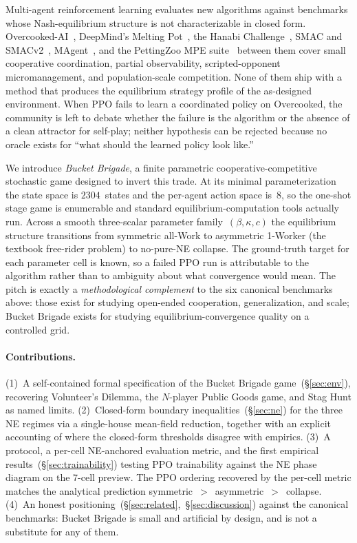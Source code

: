 \documentclass{anvil-paper}
\begin{document}
Multi-agent reinforcement learning evaluates new algorithms against benchmarks
whose Nash-equilibrium structure is not characterizable in closed form.
Overcooked-AI~\citep{overcooked2019}, DeepMind's Melting
Pot~\citep{meltingpot2021}, the Hanabi
Challenge~\citep{hanabi2020}, SMAC and SMACv2~\citep{smac2019,smacv2_2023},
MAgent~\citep{magent2018}, and the PettingZoo MPE
suite~\citep{pettingzoo2021} between them cover small cooperative
coordination, partial observability, scripted-opponent micromanagement, and
population-scale competition. None of them ship with a method that produces
the equilibrium strategy profile of the as-designed environment. When PPO
fails to learn a coordinated policy on Overcooked, the community is left to
debate whether the failure is the algorithm or the absence of a clean
attractor for self-play; neither hypothesis can be rejected because no oracle
exists for ``what should the learned policy look like.''

We introduce \emph{Bucket Brigade}, a finite parametric cooperative-competitive
stochastic game designed to invert this trade. At its minimal parameterization
the state space is $2304$~states and the per-agent action space is~$8$, so the
one-shot stage game is enumerable and standard equilibrium-computation tools
actually run. Across a smooth three-scalar parameter family~$(\beta,\kappa,c)$
the equilibrium structure transitions from symmetric all-Work to asymmetric
1-Worker (the textbook free-rider problem) to no-pure-NE collapse. The
ground-truth target for each parameter cell is known, so a failed PPO run is
attributable to the algorithm rather than to ambiguity about what convergence
would mean. The pitch is exactly a \emph{methodological complement} to the
six canonical benchmarks above: those exist for studying open-ended
cooperation, generalization, and scale; Bucket Brigade exists for studying
equilibrium-convergence quality on a controlled grid.

\paragraph{Contributions.} (1)~A self-contained formal specification of the
Bucket Brigade game~(\S\ref{sec:env}), recovering Volunteer's Dilemma, the
$N$-player Public Goods game, and Stag Hunt as named limits.
(2)~Closed-form boundary inequalities~(\S\ref{sec:ne}) for the three NE
regimes via a single-house mean-field reduction, together with an explicit
accounting of where the closed-form thresholds disagree with empirics.
(3)~A protocol, a per-cell NE-anchored evaluation metric, and the first
empirical results~(\S\ref{sec:trainability}) testing PPO trainability against
the NE phase diagram on the 7-cell preview. The PPO ordering recovered by
the per-cell metric matches the analytical prediction
\textsf{symmetric}~$>$~\textsf{asymmetric}~$>$~\textsf{collapse}.
(4)~An honest positioning~(\S\ref{sec:related},~\S\ref{sec:discussion})
against the canonical benchmarks: Bucket Brigade is small and artificial by
design, and is not a substitute for any of them.
\end{document}
